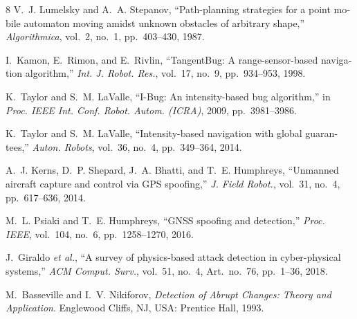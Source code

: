 \documentclass[10pt, a4paper, twocolumn]{article}
\begin{document}
\begin{otherlanguage}{english}
\begin{thebibliography}{8}
\footnotesize
\setlength{\itemsep}{0pt}
V.~J. Lumelsky and A.~A. Stepanov, ``Path-planning strategies for a point mobile automaton moving amidst unknown obstacles of arbitrary shape,'' \textit{Algorithmica}, vol.~2, no.~1, pp.~403--430, 1987.

I.~Kamon, E.~Rimon, and E.~Rivlin, ``TangentBug: A range-sensor-based navigation algorithm,'' \textit{Int. J. Robot. Res.}, vol.~17, no.~9, pp.~934--953, 1998.

K.~Taylor and S.~M. LaValle, ``I-Bug: An intensity-based bug algorithm,'' in \textit{Proc. IEEE Int. Conf. Robot. Autom. (ICRA)}, 2009, pp.~3981--3986.

K.~Taylor and S.~M. LaValle, ``Intensity-based navigation with global guarantees,'' \textit{Auton. Robots}, vol.~36, no.~4, pp.~349--364, 2014.

A.~J. Kerns, D.~P. Shepard, J.~A. Bhatti, and T.~E. Humphreys, ``Unmanned aircraft capture and control via GPS spoofing,'' \textit{J. Field Robot.}, vol.~31, no.~4, pp.~617--636, 2014.

M.~L. Psiaki and T.~E. Humphreys, ``GNSS spoofing and detection,'' \textit{Proc. IEEE}, vol.~104, no.~6, pp.~1258--1270, 2016.

J.~Giraldo \textit{et al.}, ``A survey of physics-based attack detection in cyber-physical systems,'' \textit{ACM Comput. Surv.}, vol.~51, no.~4, Art.~no.~76, pp.~1--36, 2018.

M.~Basseville and I.~V. Nikiforov, \textit{Detection of Abrupt Changes: Theory and Application}. Englewood Cliffs, NJ, USA: Prentice Hall, 1993.
\end{thebibliography}
\end{otherlanguage}
\end{document}
